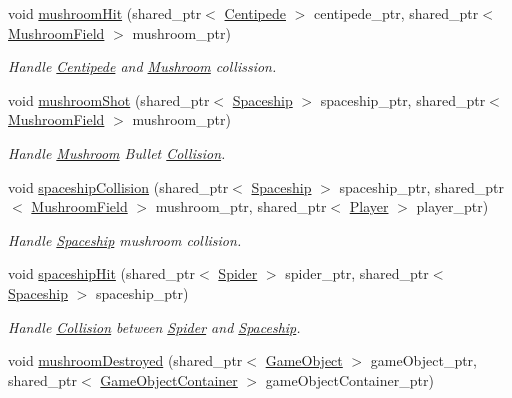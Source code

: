 \begin{DoxyCompactItemize}
void \mbox{\hyperlink{class_collision_handler_ae442cd4e1b0383607873a09c2be2bf13}{mushroom\+Hit}} (shared\+\_\+ptr$<$ \mbox{\hyperlink{class_centipede}{Centipede}} $>$ centipede\+\_\+ptr, shared\+\_\+ptr$<$ \mbox{\hyperlink{class_mushroom_field}{Mushroom\+Field}} $>$ mushroom\+\_\+ptr)
\begin{DoxyCompactList}\small\item\em Handle \mbox{\hyperlink{class_centipede}{Centipede}} and \mbox{\hyperlink{class_mushroom}{Mushroom}} collission. \end{DoxyCompactList}\item 
void \mbox{\hyperlink{class_collision_handler_af63977ae014e8013b2beca67ab3d22cf}{mushroom\+Shot}} (shared\+\_\+ptr$<$ \mbox{\hyperlink{class_spaceship}{Spaceship}} $>$ spaceship\+\_\+ptr, shared\+\_\+ptr$<$ \mbox{\hyperlink{class_mushroom_field}{Mushroom\+Field}} $>$ mushroom\+\_\+ptr)
\begin{DoxyCompactList}\small\item\em Handle \mbox{\hyperlink{class_mushroom}{Mushroom}} Bullet \mbox{\hyperlink{class_collision}{Collision}}. \end{DoxyCompactList}\item 
void \mbox{\hyperlink{class_collision_handler_a709eb0dd73f96ce7aff7fbd7deaa8355}{spaceship\+Collision}} (shared\+\_\+ptr$<$ \mbox{\hyperlink{class_spaceship}{Spaceship}} $>$ spaceship\+\_\+ptr, shared\+\_\+ptr$<$ \mbox{\hyperlink{class_mushroom_field}{Mushroom\+Field}} $>$ mushroom\+\_\+ptr, shared\+\_\+ptr$<$ \mbox{\hyperlink{class_player}{Player}} $>$ player\+\_\+ptr)
\begin{DoxyCompactList}\small\item\em Handle \mbox{\hyperlink{class_spaceship}{Spaceship}} mushroom collision. \end{DoxyCompactList}\item 
void \mbox{\hyperlink{class_collision_handler_abb75bc290df29ec796f0869329b61a1e}{spaceship\+Hit}} (shared\+\_\+ptr$<$ \mbox{\hyperlink{class_spider}{Spider}} $>$ spider\+\_\+ptr, shared\+\_\+ptr$<$ \mbox{\hyperlink{class_spaceship}{Spaceship}} $>$ spaceship\+\_\+ptr)
\begin{DoxyCompactList}\small\item\em Handle \mbox{\hyperlink{class_collision}{Collision}} between \mbox{\hyperlink{class_spider}{Spider}} and \mbox{\hyperlink{class_spaceship}{Spaceship}}. \end{DoxyCompactList}\item 
void \mbox{\hyperlink{class_collision_handler_a314663c4aa7a14e7b935794796e6e7c5}{mushroom\+Destroyed}} (shared\+\_\+ptr$<$ \mbox{\hyperlink{class_game_object}{Game\+Object}} $>$ game\+Object\+\_\+ptr, shared\+\_\+ptr$<$ \mbox{\hyperlink{class_game_object_container}{Game\+Object\+Container}} $>$ game\+Object\+Container\+\_\+ptr)

\end{DoxyCompactItemize}
